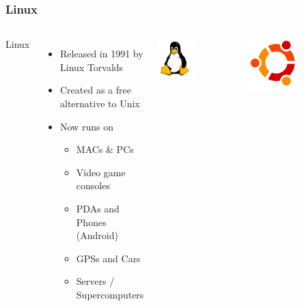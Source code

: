 \documentclass{beamer}
\begin{document}
\begin{frame}
  \frametitle{Linux}
  \begin{columns}
    \begin{LARGE}
      Linux
    \end{LARGE}
    \begin{itemize}
    \item Released in 1991 by Linux Torvalds
    \item Created as a free alternative to Unix
    \item Now runs on
      \begin{itemize}
      \item MACs \& PCs
      \item Video game consoles
      \item PDAs and Phones (Android)
      \item GPSs and Cars
      \item Servers / Supercomputers
      \end{itemize}
    \end{itemize}
      \begin{center}\includegraphics[width=0.5\textwidth]{../img/tux}\end{center}
      
      \begin{center}\includegraphics[width=0.5\textwidth]{../img/ubuntu}\end{center}
  \end{columns}
\end{frame}
\end{document}
